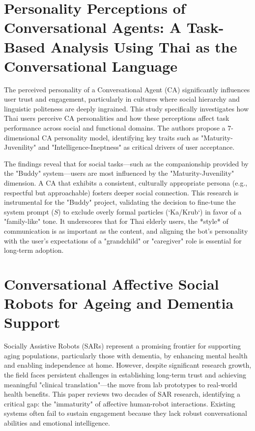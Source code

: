 \newpage
\section[Personality Perceptions of Conversational Agents: A Task-Based Analysis Using Thai as the Conversational Language]{Personality Perceptions of Conversational Agents: A Task-Based Analysis Using Thai as the Conversational Language \cite{paper_10}}
\hspace*{17pt} The perceived personality of a Conversational Agent (CA) significantly influences user trust and engagement, particularly in cultures where social hierarchy and linguistic politeness are deeply ingrained. This study specifically investigates how Thai users perceive CA personalities and how these perceptions affect task performance across social and functional domains. The authors propose a 7-dimensional CA personality model, identifying key traits such as "Maturity-Juvenility" and "Intelligence-Ineptness" as critical drivers of user acceptance.

The findings reveal that for social tasks—such as the companionship provided by the "Buddy" system—users are most influenced by the "Maturity-Juvenility" dimension. A CA that exhibits a consistent, culturally appropriate persona (e.g., respectful but approachable) fosters deeper social connection. This research is instrumental for the "Buddy" project, validating the decision to fine-tune the system prompt ($S$) to exclude overly formal particles (`Ka/Krub`) in favor of a "family-like" tone. It underscores that for Thai elderly users, the *style* of communication is as important as the content, and aligning the bot's personality with the user's expectations of a "grandchild" or "caregiver" role is essential for long-term adoption.

\newpage
\section[Conversational Affective Social Robots for Ageing and Dementia Support]{Conversational Affective Social Robots for Ageing and Dementia Support \cite{paper_11}}
\hspace*{17pt} Socially Assistive Robots (SARs) represent a promising frontier for supporting aging populations, particularly those with dementia, by enhancing mental health and enabling independence at home. However, despite significant research growth, the field faces persistent challenges in establishing long-term trust and achieving meaningful "clinical translation"—the move from lab prototypes to real-world health benefits. This paper reviews two decades of SAR research, identifying a critical gap: the "immaturity" of affective human-robot interactions. Existing systems often fail to sustain engagement because they lack robust conversational abilities and emotional intelligence.

